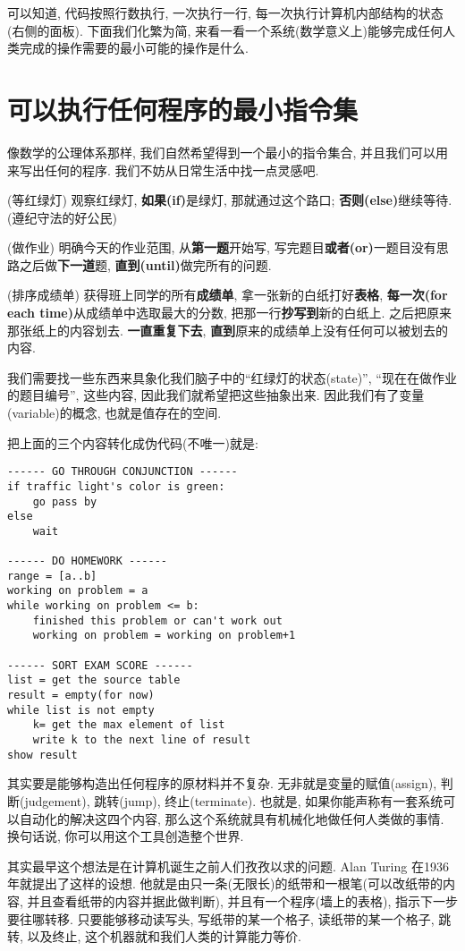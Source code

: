 可以知道, 代码按照行数执行, 一次执行一行, 每一次执行计算机内部结构的状态(右侧的面板). 下面我们化繁为简, 来看一看一个系统(数学意义上)能够完成任何人类完成的操作需要的最小可能的操作是什么. 

\section{可以执行任何程序的最小指令集}
像数学的公理体系那样, 我们自然希望得到一个最小的指令集合, 并且我们可以用来写出任何的程序. 我们不妨从日常生活中找一点灵感吧.
\begin{example}
(等红绿灯) 观察红绿灯, \textbf{如果(if)}是绿灯, 那就通过这个路口; \textbf{否则(else)}继续等待. (遵纪守法的好公民)

(做作业) 明确今天的作业范围, 从\textbf{第一题}开始写, 写完题目\textbf{或者(or)}一题目没有思路之后做\textbf{下一道}题,
\textbf{直到(until)}做完所有的问题.

(排序成绩单) 获得班上同学的所有\textbf{成绩单}, 拿一张新的白纸打好\textbf{表格}, \textbf{每一次(for each time)}从成绩单中选取最大的分数,
把那一行\textbf{抄写到}新的白纸上. 之后把原来那张纸上的内容划去. \textbf{一直重复下去}, \textbf{直到}原来的成绩单上没有任何可以被划去的内容.
\end{example}
我们需要找一些东西来具象化我们脑子中的``红绿灯的状态(state)'', ``现在在做作业的题目编号'', 这些内容, 因此我们就希望把这些抽象出来.
因此我们有了变量(variable)的概念, 也就是值存在的空间. 

把上面的三个内容转化成伪代码(不唯一)就是:
\begin{verbatim}
------ GO THROUGH CONJUNCTION ------
if traffic light's color is green:
    go pass by
else
    wait

------ DO HOMEWORK ------
range = [a..b]
working on problem = a
while working on problem <= b:
    finished this problem or can't work out
    working on problem = working on problem+1

------ SORT EXAM SCORE ------
list = get the source table
result = empty(for now)
while list is not empty
    k= get the max element of list
    write k to the next line of result
show result
\end{verbatim}
其实要是能够构造出任何程序的原材料并不复杂. 无非就是变量的赋值(assign), 判断(judgement), 跳转(jump), 终止(terminate). 也就是, 如果你能声称有一套系统可以自动化的解决这四个内容,
那么这个系统就具有机械化地做任何人类做的事情. 换句话说, 你可以用这个工具创造整个世界. 

其实最早这个想法是在计算机诞生之前人们孜孜以求的问题. Alan Turing 在1936年就提出了这样的设想. 他就是由只一条(无限长)的纸带和一根笔(可以改纸带的内容,
并且查看纸带的内容并据此做判断), 并且有一个程序(墙上的表格), 指示下一步要往哪转移. 只要能够移动读写头, 写纸带的某一个格子,
读纸带的某一个格子, 跳转, 以及终止, 这个机器就和我们人类的计算能力等价. 

